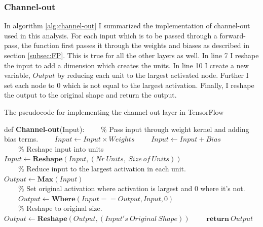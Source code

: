 \subsubsection*{Channel-out}
In algorithm \ref{alg:channel-out} I summarized the implementation of channel-out used in this analysis. For each 
input which is to be passed through a forward-pass, the function first passes it through the weights and biases 
as described in section \ref{subsec:FP}. This is true for all the other layers as well. In line 7 I reshape the input 
to add a dimension which creates the units. In line 10 I create a new variable, $Output$ by reducing each unit to the 
largest activated node. Further I set each node to 0 which is not equal to the largest activation. Finally, I reshape 
the output to the original shape and return the output.  
\begin{algorithm}
    \caption{The pseudocode for implementing the channel-out layer in TensorFlow}\label{alg:channel-out}
    \begin{algorithmic}[1]
    \State def \textbf{Channel-out}(Input): 
    \State \ \ \ \ $\%$ Pass input through weight kernel and adding bias terms.
    \State \ \ \ \ $Input \gets Input \times Weights$
    \State \ \ \ \ $Input \gets Input + Bias$
    \\
    \State \ \ \ \ $\%$ Reshape input into units
    \State \ \ \ \ $Input \gets \textbf{Reshape}(Input,(Nr\ Units,\ Size \ of \ Units))$
    \\
    \State \ \ \ \ $\%$ Reduce input to the largest activation in each unit.
    \State \ \ \ \ $Output \gets \textbf{Max}(Input)$
    \\
    \State \ \ \ \ $\%$ Set original activation where activation is largest and 0 where it's not.
    \State \ \ \ \ $Output \gets \textbf{Where}(Input == Output, Input,0)$
    \\
    \State \ \ \ \ $\%$ Reshape to original size.
    \State \ \ \ \ $Output \gets \textbf{Reshape}(Output,(Input's \ Original \ Shape))$
    \State \ \ \ \ $\textbf{return}\ Output$
    \end{algorithmic}
\end{algorithm}
